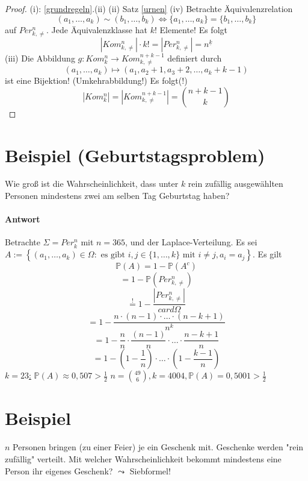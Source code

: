 \documentclass[a4paper,11pt,notitlepage]{report}
\newcommand{\Prim}{{\ensuremath{\mathbb{P}}}}
\begin{document}
\begin{proof}
	(i): \ref{grundregeln}.(ii)
	\newline
	(ii) Satz \ref{urnen}
	\newline
	(iv) Betrachte Äquivalenzrelation $$(a_1,\ldots,a_k) \sim (b_1,\ldots,b_k) \Leftrightarrow \{a_1,\ldots,a_k\} = \{b_1,\ldots,b_k\}$$ auf $Per_{k,\neq}^n$. Jede Äquivalenzklasse hat $k!$ Elemente! Es folgt
		$$|Kom_{k,\neq}^n| \cdot k! = |Per_{k,\neq}^n| = n^{\underline{k}}$$
	(iii) Die Abbildung $g \colon Kom_k^n \rightarrow Kom_{k,\neq}^{n+k-1}$ definiert durch $$(a_1,\ldots,a_k) \mapsto (a_1,a_2+1,a_3+2,\ldots,a_k+k-1)$$ ist eine Bijektion! (Umkehrabbildung!) Es folgt(!)
		$$|Kom_k^n| = |Kom_{k,\neq}^{n+k-1}| = {{n+k-1} \choose k}$$
\end{proof}

\section{Beispiel (Geburtstagsproblem)}
Wie groß ist die Wahrscheinlichkeit, dass unter $k$ rein zufällig ausgewählten Personen mindestens zwei am selben Tag Geburtstag haben?

\paragraph{Antwort}
Betrachte $\Sigma = Per_k^n$ mit $n=365$, und der Laplace-Verteilung.
\newline
Es sei $A:=\left\{(a_1,\ldots,a_k) \in \Omega \colon \text{ es gibt } i,j \in \{1,\ldots,k\} \text{ mit } i \neq j, a_i = a_j \right \}$.
Es gilt
$$\Prim(A) = 1- \Prim(A^c)$$
$$= 1- \Prim(Per_{k,\neq}^n)$$
$$\overset{!}{=}1-\frac{|Per_{k,\neq}^n|}{card \Omega}$$
$$= 1- \frac{n \cdot (n-1) \cdot \ldots \cdot (n-k+1)}{n^k}$$
$$= 1- \frac{n}{n} \cdot \frac{(n-1)}{n} \cdot \ldots \cdot \frac{n-k+1}{n}$$
$$= 1- (1-\frac{1}{n}) \cdot \ldots \cdot (1- \frac{k-1}{n})$$
\underline{$k=23$:} $\Prim(A) \approx 0,507 > \frac{1}{2}$
\newline
$n={49 \choose 6}, k=4004, \Prim(A) = 0,5001 > \frac{1}{2}$

\section{Beispiel}
$n$ Personen bringen (zu einer Feier) je ein Geschenk mit. Geschenke werden "rein zufällig" verteilt. Mit welcher Wahrscheinlichkeit bekommt mindestens eine Person ihr eigenes Geschenk? 
\newline
$\leadsto$ Siebformel!
\end{document}
